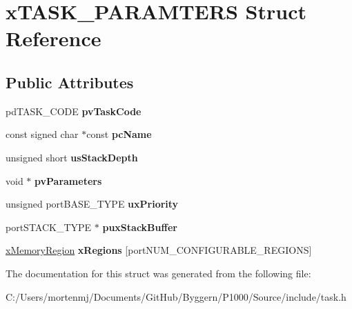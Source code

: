 \hypertarget{structx_t_a_s_k___p_a_r_a_m_t_e_r_s}{\section{x\-T\-A\-S\-K\-\_\-\-P\-A\-R\-A\-M\-T\-E\-R\-S Struct Reference}
\label{structx_t_a_s_k___p_a_r_a_m_t_e_r_s}
}
\subsection*{Public Attributes}
\begin{DoxyCompactItemize}
\item 
\hypertarget{structx_t_a_s_k___p_a_r_a_m_t_e_r_s_a6cf96a364e0960bde2091fc333db4fe8}{pd\-T\-A\-S\-K\-\_\-\-C\-O\-D\-E {\bfseries pv\-Task\-Code}}\label{structx_t_a_s_k___p_a_r_a_m_t_e_r_s_a6cf96a364e0960bde2091fc333db4fe8}

\item 
\hypertarget{structx_t_a_s_k___p_a_r_a_m_t_e_r_s_a1abd63642561418cd7c05ae24750436b}{const signed char $\ast$const {\bfseries pc\-Name}}\label{structx_t_a_s_k___p_a_r_a_m_t_e_r_s_a1abd63642561418cd7c05ae24750436b}

\item 
\hypertarget{structx_t_a_s_k___p_a_r_a_m_t_e_r_s_a78a22fdc211362ec426d12678c6f538f}{unsigned short {\bfseries us\-Stack\-Depth}}\label{structx_t_a_s_k___p_a_r_a_m_t_e_r_s_a78a22fdc211362ec426d12678c6f538f}

\item 
\hypertarget{structx_t_a_s_k___p_a_r_a_m_t_e_r_s_a658917accb7ddae9d0befcc0904eb867}{void $\ast$ {\bfseries pv\-Parameters}}\label{structx_t_a_s_k___p_a_r_a_m_t_e_r_s_a658917accb7ddae9d0befcc0904eb867}

\item 
\hypertarget{structx_t_a_s_k___p_a_r_a_m_t_e_r_s_a986b666d0e341b98f5924c3531e43fc3}{unsigned port\-B\-A\-S\-E\-\_\-\-T\-Y\-P\-E {\bfseries ux\-Priority}}\label{structx_t_a_s_k___p_a_r_a_m_t_e_r_s_a986b666d0e341b98f5924c3531e43fc3}

\item 
\hypertarget{structx_t_a_s_k___p_a_r_a_m_t_e_r_s_aaadcae4a91cd0a46473d9c993091f5e1}{port\-S\-T\-A\-C\-K\-\_\-\-T\-Y\-P\-E $\ast$ {\bfseries pux\-Stack\-Buffer}}\label{structx_t_a_s_k___p_a_r_a_m_t_e_r_s_aaadcae4a91cd0a46473d9c993091f5e1}

\item 
\hypertarget{structx_t_a_s_k___p_a_r_a_m_t_e_r_s_a3369446f636e3d74d46d174590e244f0}{\hyperlink{structx_m_e_m_o_r_y___r_e_g_i_o_n}{x\-Memory\-Region} {\bfseries x\-Regions} \mbox{[}port\-N\-U\-M\-\_\-\-C\-O\-N\-F\-I\-G\-U\-R\-A\-B\-L\-E\-\_\-\-R\-E\-G\-I\-O\-N\-S\mbox{]}}\label{structx_t_a_s_k___p_a_r_a_m_t_e_r_s_a3369446f636e3d74d46d174590e244f0}

\end{DoxyCompactItemize}


The documentation for this struct was generated from the following file\-:\begin{DoxyCompactItemize}
\item 
C\-:/\-Users/mortenmj/\-Documents/\-Git\-Hub/\-Byggern/\-P1000/\-Source/include/task.\-h\end{DoxyCompactItemize}
